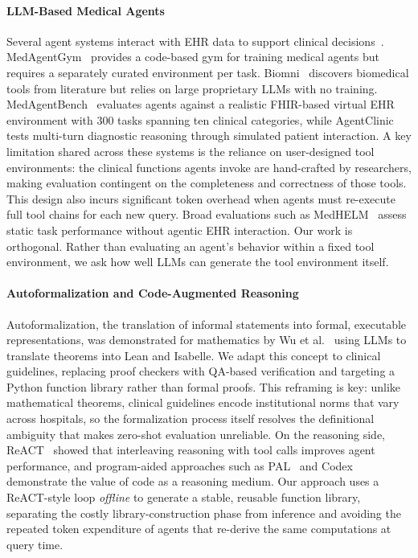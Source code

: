 \paragraph{LLM-Based Medical Agents}
Several agent systems interact with EHR data to support clinical decisions~\cite{liao2026agentehr, tang2024medagents, hager2024evaluation, bani2025language}. MedAgentGym~\cite{xu2025medagentgym} provides a code-based gym for training medical agents but requires a separately curated environment per task. Biomni~\cite{huang2025biomni} discovers biomedical tools from literature but relies on large proprietary LLMs with no training. MedAgentBench~\cite{kim2025medagentbench} evaluates agents against a realistic FHIR-based virtual EHR environment with 300 tasks spanning ten clinical categories, while AgentClinic~\cite{schmidgall2024agentclinic} tests multi-turn diagnostic reasoning through simulated patient interaction. A key limitation shared across these systems is the reliance on user-designed tool environments: the clinical functions agents invoke are hand-crafted by researchers, making evaluation contingent on the completeness and correctness of those tools. This design also incurs significant token overhead when agents must re-execute full tool chains for each new query. Broad evaluations such as MedHELM~\cite{bedi2025medhelm, bedi2026holistic} assess static task performance without agentic EHR interaction. Our work is orthogonal. Rather than evaluating an agent's behavior within a fixed tool environment, we ask how well LLMs can generate the tool environment itself.

\paragraph{Autoformalization and Code-Augmented Reasoning}
Autoformalization, the translation of informal statements into formal, executable representations, was demonstrated for mathematics by Wu et al.~\cite{wu2022autoformalization} using LLMs to translate theorems into Lean and Isabelle. We adapt this concept to clinical guidelines, replacing proof checkers with QA-based verification and targeting a Python function library rather than formal proofs. This reframing is key: unlike mathematical theorems, clinical guidelines encode institutional norms that vary across hospitals, so the formalization process itself resolves the definitional ambiguity that makes zero-shot evaluation unreliable. On the reasoning side, ReACT~\cite{yao2023react} showed that interleaving reasoning with tool calls improves agent performance, and program-aided approaches such as PAL~\cite{gao2023pal} and Codex~\cite{chen2021codex} demonstrate the value of code as a reasoning medium. Our approach uses a ReACT-style loop \emph{offline} to generate a stable, reusable function library, separating the costly library-construction phase from inference and avoiding the repeated token expenditure of agents that re-derive the same computations at query time.
